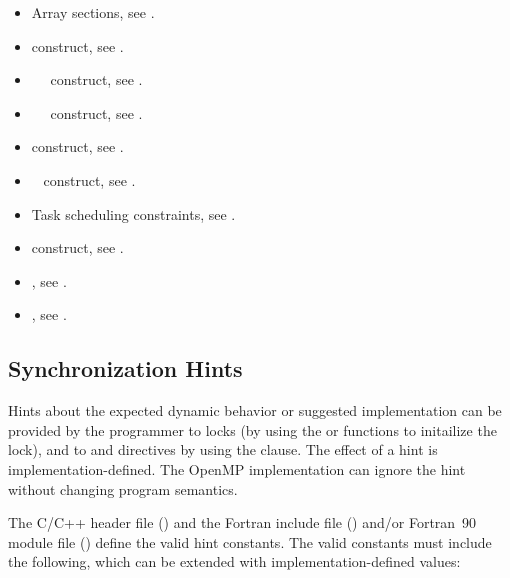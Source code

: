 \crossreferences
\begin{itemize}
\item Array sections, see
.

\item {} construct, see 
.

\item {}~~ construct, see 
.

\item {}~~ construct, see 
.

\item {} construct, see 
.

\item {}~ construct, see 
.

\item Task scheduling constraints, see
. 

\item {} construct, see
. 

\item {}, see
.

\item {}, see
.
\end{itemize}

\subsection{Synchronization Hints}
\label{subsec:Synchronization Hints}
Hints about the expected dynamic behavior or suggested implementation
can be provided by the programmer to locks (by using 
the  or
 functions to initailize the lock), and to
 and  directives by using the 
clause.  The effect of a hint is implementation-defined. The OpenMP
implementation can ignore the hint without changing program semantics.

The C/C++ header file () and the Fortran include file () and/or Fortran~90 module file () define the valid hint constants.  
The valid constants must include the following, which can be extended with implementation-defined values:

